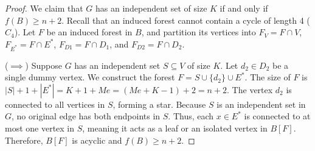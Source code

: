 \documentclass[a4paper]{amsart}
\begin{document}
\begin{proof}
    We claim that $G$ has an independent set of size $K$ if and only if $f(B) \ge n+2$. Recall that an induced forest cannot contain a cycle of length 4 ($C_4$). Let $F$ be an induced forest in $B$, and partition its vertices into $F_V = F \cap V$, $F_{E^*} = F \cap E^*$, $F_{D1} = F \cap D_1$, and $F_{D2} = F \cap D_2$.
    
    ($\implies$) Suppose $G$ has an independent set $S \subseteq V$ of size $K$. Let $d_2 \in D_2$ be a single dummy vertex. We construct the forest $F = S \cup \{d_2\} \cup E^*$. The size of $F$ is $|S| + 1 + |E^*| = K + 1 + M e = (M e + K - 1) + 2 = n + 2$. The vertex $d_2$ is connected to all vertices in $S$, forming a star. Because $S$ is an independent set in $G$, no original edge has both endpoints in $S$. Thus, each $x \in E^*$ is connected to at most one vertex in $S$, meaning it acts as a leaf or an isolated vertex in $B[F]$. Therefore, $B[F]$ is acyclic and $f(B) \ge n+2$.
    

\end{proof}
\end{document}

